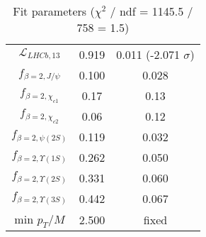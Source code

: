 \begin{table}[h!]
\begin{tabular}{c|c|c}
$\mathcal L_{LHCb,13}$ & 0.919 & 0.011 (-2.071 $\sigma$) \\
$f_{\beta=2,J/\psi}$ & 0.100 & 0.028 \\
$f_{\beta=2,\chi_{c1}}$ & 0.17 & 0.13 \\
$f_{\beta=2,\chi_{c2}}$ & 0.06 & 0.12 \\
$f_{\beta=2,\psi(2S)}$ & 0.119 & 0.032 \\
$f_{\beta=2,\Upsilon(1S)}$ & 0.262 & 0.050 \\
$f_{\beta=2,\Upsilon(2S)}$ & 0.331 & 0.060 \\
$f_{\beta=2,\Upsilon(3S)}$ & 0.442 & 0.067 \\
min $p_T/M$ & 2.500 & fixed \\
\end{tabular}
\caption{Fit parameters ($\chi^2$ / ndf = 1145.5 / 758 = 1.5)}
\end{table}

